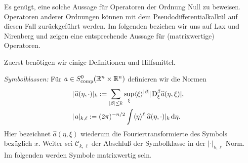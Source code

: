Es genügt, eine solche Aussage für Operatoren der Ordnung Null zu beweisen. Operatoren anderer Ordnungen können mit dem Pseudodifferentialkalkül auf diesen Fall zurückgeführt werden. Im folgenden beziehen wir uns auf  Lax und Nirenberg \cite{Lax:1966} und zeigen eine entsprechende Aussage für (matrixwertige) Operatoren. 

Zuerst benötigen wir einige Definitionen und Hilfsmittel.

\medskip\noindent
{\em Symbolklassen:} Für $ a\in S^0_{\rm comp}(\mathbb R^n\times\mathbb R^n)$ definieren wir die Normen
\begin{equation}
\begin{split}&	\vert \widehat{a}(\eta,\cdot)\vert_k := \sum\limits_{\vert \beta\vert \le k} \sup\limits_{\xi} \langle \xi\rangle^{\vert \beta\vert}\vert\mathrm D_\xi^\beta  \widehat{a}(\eta,\xi)\vert,\\
&   | a|_{k,\ell} := (2\pi)^{-n/2} \int \langle\eta\rangle^\ell   \vert \widehat{a}(\eta,\cdot)\vert_k \,\mathrm d \eta.
\end{split}
\end{equation}
Hier bezeichnet $\widehat a(\eta,\xi)$ wiederum die Fouriertransformierte des Symbols bezüglich $x$. Weiter sei $\mathcal{C}_{k,\ell}$ der Abschluß der Symbolklasse in der $ |\cdot |_{k,\ell}$-Norm.
Im folgenden werden Symbole matrixwertig sein.


